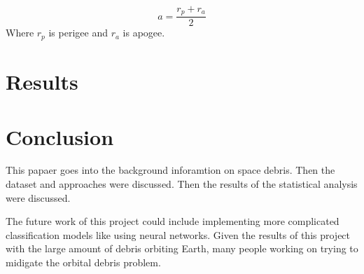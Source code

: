 \documentclass[12pt,a4paper]{article}
\begin{document}
\begin{equation}
a = \frac{r_p + r_a }{2}
\end{equation}
Where $r_p$ is perigee and $r_a$ is apogee.



\section{Results}

\section{Conclusion}
This papaer goes into the background inforamtion on space debris. Then the dataset and approaches were discussed. Then the results of the statistical analysis were discussed.

The future work of this project could include implementing more complicated classification models like using neural networks.
Given the results of this project with the large amount of debris orbiting Earth, many people working on trying to midigate the orbital debris problem. 

 
\end{document}
